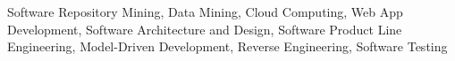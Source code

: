 

\begin{cvparagraph}

Software Repository Mining, Data Mining, Cloud Computing, Web App Development, Software Architecture and Design, Software Product Line Engineering, Model-Driven Development, Reverse Engineering, Software Testing 

\end{cvparagraph}
